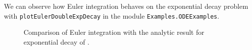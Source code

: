 \documentclass[12pt,openany]{book}
\begin{document}
We can observe how Euler integration behaves on the exponential decay problem with \texttt{plotEulerDoubleExpDecay} in the module \texttt{Examples.ODEExamples}.

\begin{figure}[htbp]
  \centering
  \resizebox{\textwidth}{!}{}
  \caption{Comparison of Euler integration with the analytic result for exponential decay of .}
  \label{fig:euler-double-exp-decay}
\end{figure}


\printunsrtglossary[type=symbols,style=long]

\clearpage{}
{}


\end{document}
